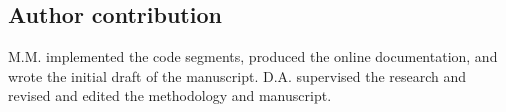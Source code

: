 \documentclass[pdflatex,sn-basic]{sn-jnl}
\begin{document}
\subsection*{Author contribution}
M.M. implemented the code segments, produced the online documentation, and wrote the initial draft of the manuscript. D.A. supervised the research and revised and edited the methodology and manuscript.
 
 




 
\end{document}
